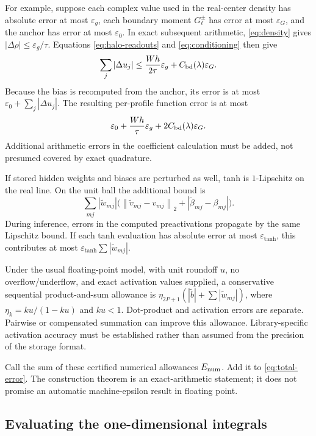 \documentclass[11pt]{article}
\newcommand{\norm}[1]{\left\lVert#1\right\rVert}
\begin{document}
For example, suppose each complex value used in the real-center density has absolute error at most $\varepsilon_g$, each boundary moment $G_\ell^\pm$ has error at most $\varepsilon_G$, and the anchor has error at most $\varepsilon_0$. In exact subsequent arithmetic, \eqref{eq:density} gives $|\Delta\rho|\le\varepsilon_g/\tau$. Equations \eqref{eq:halo-readouts} and \eqref{eq:conditioning} then give
\[
 \sum_j|\Delta u_j|\le\frac{Wh}{2\tau}\varepsilon_g+
 C_{\rm bd}(\lambda)\varepsilon_G.
\]
Because the bias is recomputed from the anchor, its error is at most $\varepsilon_0+\sum_j|\Delta u_j|$. The resulting per-profile function error is at most
\begin{equation}
 \varepsilon_0+\frac{Wh}{\tau}\varepsilon_g+
 2C_{\rm bd}(\lambda)\varepsilon_G.
 \label{eq:data-propagation}
\end{equation}
Additional arithmetic errors in the coefficient calculation must be added, not presumed covered by exact quadrature.

If stored hidden weights and biases are perturbed as well, tanh is $1$-Lipschitz on the real line. On the unit ball the additional bound is
\[
 \sum_{mj}|\widetilde w_{mj}|
 \big(\norm{\widetilde v_{mj}-v_{mj}}_2+
 |\widetilde\beta_{mj}-\beta_{mj}|\big).
\]
During inference, errors in the computed preactivations propagate by the same Lipschitz bound. If each tanh evaluation has absolute error at most $\varepsilon_{\tanh}$, this contributes at most
$\varepsilon_{\tanh}\sum|\widetilde w_{mj}|$.

Under the usual floating-point model, with unit roundoff $u$, no overflow/underflow, and exact activation values supplied, a conservative sequential product-and-sum allowance is
$\eta_{2P+1}(|\widetilde b|+\sum|\widetilde w_{mj}|)$, where $\eta_k=ku/(1-ku)$ and $ku<1$. Dot-product and activation errors are separate. Pairwise or compensated summation can improve this allowance. Library-specific activation accuracy must be established rather than assumed from the precision of the storage format.

Call the sum of these certified numerical allowances $E_{\rm num}$. Add it to \eqref{eq:total-error}. The construction theorem is an exact-arithmetic statement; it does not promise an automatic machine-epsilon result in floating point.

\subsection{Evaluating the one-dimensional integrals}
\end{document}
